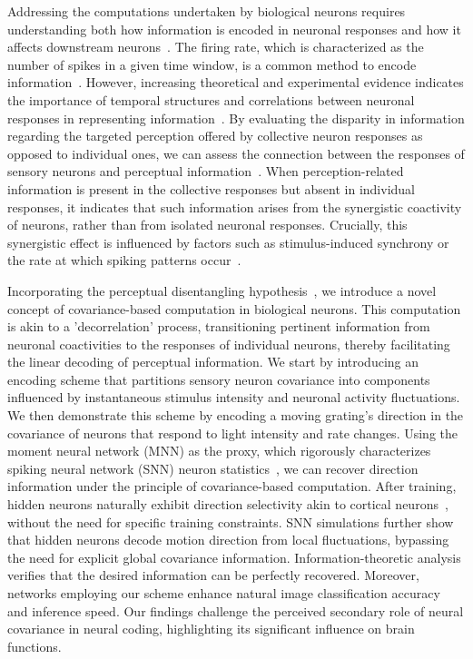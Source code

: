 Addressing the computations undertaken by biological neurons requires understanding both how information is encoded in neuronal responses and how it affects downstream neurons~\cite{Panzeri2017}.
The firing rate, which is characterized as the number of spikes in a given time window, is a common method to encode information~\cite{Golledge2003, montani2007role, Rolls2011}.
However, increasing theoretical and experimental evidence indicates the importance of temporal structures and correlations between neuronal responses in representing information~\cite{Shamir2004, Averbeck2006a, Pillow2008, ElGaby2021, panzeri2022structures-reviews}.
By evaluating the disparity in information regarding the targeted perception offered by collective neuron responses as opposed to individual ones, we can assess the connection between the responses of sensory neurons and perceptual information~\cite{Pola2003, Schneidman2003}. 
When perception-related information is present in the collective responses but absent in individual responses, it indicates that such information arises from the synergistic coactivity of neurons, rather than from isolated neuronal responses.
Crucially, this synergistic effect is influenced by factors such as stimulus-induced synchrony or the rate at which spiking patterns occur~\cite{quiroga2013principles, panzeri2022structures-reviews}. 

Incorporating the perceptual disentangling hypothesis~\cite{DiCarlo2007, DiCarlo2012}, we introduce a novel concept of covariance-based computation in biological neurons. 
This computation is akin to a 'decorrelation' process, transitioning pertinent information from neuronal coactivities to the responses of individual neurons, thereby facilitating the linear decoding of perceptual information.
We start by introducing an encoding scheme that partitions sensory neuron covariance into components influenced by instantaneous stimulus intensity and neuronal activity fluctuations. 
We then demonstrate this scheme by encoding a moving grating's direction in the covariance of neurons that respond to light intensity and rate changes. 
Using the moment neural network (MNN) as the proxy, which rigorously characterizes spiking neural network (SNN) neuron statistics~\cite{Feng2006, Lu2010, Qi2023}, we can recover direction information under the principle of covariance-based computation.
After training, hidden neurons naturally exhibit direction selectivity akin to cortical neurons~\cite{Sclar1982, Kohn2005}, without the need for specific training constraints.
SNN simulations further show that hidden neurons decode motion direction from local fluctuations, bypassing the need for explicit global covariance information.
Information-theoretic analysis verifies that the desired information can be perfectly recovered. 
Moreover, networks employing our scheme enhance natural image classification accuracy and inference speed. 
Our findings challenge the perceived secondary role of neural covariance in neural coding, highlighting its significant influence on brain functions.